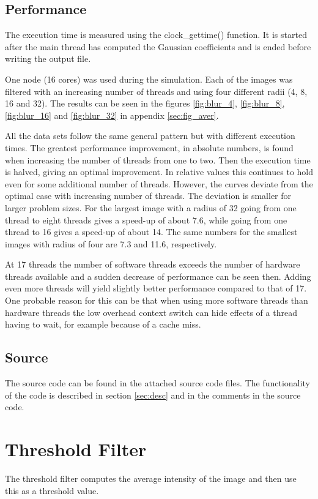 \documentclass[a4paper, 12pt]{article}
\begin{document}
\subsection{Performance}
The execution time is measured using the clock\_gettime() function. It is
started after the main thread has computed the Gaussian coefficients 
and is ended before writing the output file. 

One node (16 cores) was used during the simulation. Each of the images was
filtered with an increasing number of threads and using four different radii
(4, 8, 16 and 32). The results can be seen in the figures
\ref{fig:blur_4}, \ref{fig:blur_8}, \ref{fig:blur_16} and \ref{fig:blur_32} in
appendix \ref{sec:fig_aver}.

All the data sets follow the same general pattern but with different execution
times. The greatest performance improvement, in absolute numbers,
is found when increasing the number of threads from one to two. Then the execution 
time is halved, giving an optimal improvement. In relative values this continues
to hold even for some additional number of threads. However, the curves deviate
from the optimal case with increasing number of threads. The deviation is
smaller for larger problem sizes. For the largest image with a radius of 32 
going from one thread to eight threads gives a speed-up of about 7.6, while
going from one thread to 16 gives a speed-up of about 14. The same numbers for
the smallest images with radius of four are 7.3 and 11.6, respectively. 

At 17 threads the number of software threads exceeds the number of hardware
threads available and a sudden decrease of performance can be seen then. Adding
even more threads will yield slightly better performance compared to that of 17.
One probable reason for this can be that when using more software threads than
hardware threads the low overhead context switch can hide effects of a thread
having to wait, for example because of a cache miss.


\subsection{Source}

The source code can be found in the attached source code files.
The functionality of the code is described in section \ref{sec:desc} and in the
comments in the source code.


\section{Threshold Filter}
The threshold filter computes the average intensity of the image and then use
this as a threshold value.
\end{document}
